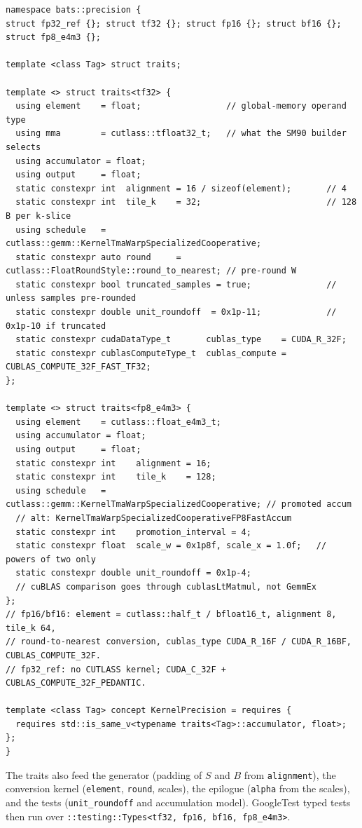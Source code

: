 \documentclass[10pt,letterpaper]{article}
\begin{document}
\begin{lstlisting}
namespace bats::precision {
struct fp32_ref {}; struct tf32 {}; struct fp16 {}; struct bf16 {}; struct fp8_e4m3 {};

template <class Tag> struct traits;

template <> struct traits<tf32> {
  using element    = float;                 // global-memory operand type
  using mma        = cutlass::tfloat32_t;   // what the SM90 builder selects
  using accumulator = float;
  using output     = float;
  static constexpr int  alignment = 16 / sizeof(element);       // 4
  static constexpr int  tile_k    = 32;                         // 128 B per k-slice
  using schedule   = cutlass::gemm::KernelTmaWarpSpecializedCooperative;
  static constexpr auto round     = cutlass::FloatRoundStyle::round_to_nearest; // pre-round W
  static constexpr bool truncated_samples = true;               // unless samples pre-rounded
  static constexpr double unit_roundoff  = 0x1p-11;             // 0x1p-10 if truncated
  static constexpr cudaDataType_t       cublas_type    = CUDA_R_32F;
  static constexpr cublasComputeType_t  cublas_compute = CUBLAS_COMPUTE_32F_FAST_TF32;
};

template <> struct traits<fp8_e4m3> {
  using element    = cutlass::float_e4m3_t;
  using accumulator = float;
  using output     = float;
  static constexpr int    alignment = 16;
  static constexpr int    tile_k    = 128;
  using schedule   = cutlass::gemm::KernelTmaWarpSpecializedCooperative; // promoted accum
  // alt: KernelTmaWarpSpecializedCooperativeFP8FastAccum
  static constexpr int    promotion_interval = 4;
  static constexpr float  scale_w = 0x1p8f, scale_x = 1.0f;   // powers of two only
  static constexpr double unit_roundoff = 0x1p-4;
  // cuBLAS comparison goes through cublasLtMatmul, not GemmEx
};
// fp16/bf16: element = cutlass::half_t / bfloat16_t, alignment 8, tile_k 64,
// round-to-nearest conversion, cublas_type CUDA_R_16F / CUDA_R_16BF, CUBLAS_COMPUTE_32F.
// fp32_ref: no CUTLASS kernel; CUDA_C_32F + CUBLAS_COMPUTE_32F_PEDANTIC.

template <class Tag> concept KernelPrecision = requires {
  requires std::is_same_v<typename traits<Tag>::accumulator, float>;
};
}
\end{lstlisting}

The traits also feed the generator (padding of $S$ and $B$ from \texttt{alignment}), the conversion kernel (\texttt{element}, \texttt{round}, scales), the epilogue (\texttt{alpha} from the scales), and the tests (\texttt{unit\_roundoff} and accumulation model). GoogleTest typed tests then run over \texttt{::testing::Types<tf32, fp16, bf16, fp8\_e4m3>}.
\end{document}
